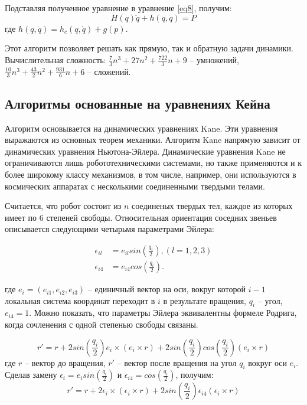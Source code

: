Подставляя полученное уравнение в уравнение \ref{eq8}, получим:
\begin{equation}
H(q) \ddot q + h (q, \dot q) = P
\end{equation}
где $h (q, \dot q) = h_c (q, \dot q) + g(p)$.

Этот алгоритм позволяет решать как прямую, так и обратную задачи динамики. Вычислительная сложность: $\frac{7}{3} n^3 + 27 n^2 + \frac{722}{3} n + 9$ -- умножений, $\frac{10}{3} n^3 + \frac{43}{2} n^2 + \frac{931}{6} n + 6$ -- сложений.


\subsection{Алгоритмы основанные на уравнениях Кейна}
Алгоритм основывается на динамических уравнениях Kane. Эти уравнения выражаются из основных теорем механики. Алгоритм Kane напрямую зависит от динамических уравнения Ньютона-Эйлера. Динамические уравнения Kane не ограничиваются лишь робототехническими системами, но также применяются и к более широкому классу механизмов, в том числе, например, они используются в космических аппаратах с несколькими соединенными твердыми телами.

Считается, что робот состоит из $n$ соединеных твердых тел, каждое из которых имеет по 6 степеней свободы. Относительная ориентация соседних звеньев описывается следующими четырьмя параметрами Эйлера:

\begin{align*}
\epsilon_{il} &= e_{il} sin (\frac{q_i}{2}), (l=1,2,3)\\
\epsilon_{i4} &= e_{i4} cos (\frac{q_i}{2}). 
\end{align*}

где $e_i = (e_{i1}, e_{i2}, e_{i3})$ -- единичный вектор на оси, вокруг которой $i-1$ локальная система координат переходит в $i$ в результате вращения, $q_i$ -- угол, $e_{i4} = 1$. Можно показать, что параметры Эйлера эквивалентны формеле Родрига, когда сочленения с одной степенью свободы связаны. 

\begin{equation}
r' = r + 2 sin (\frac{q_i}{2}) e_i \times (e_i \times r) + 2 sin (\frac{q_i}{2}) cos (\frac{q_i}{2}) (e_i \times r)
\end{equation}
где $r$ -- вектор до вращения, $r'$ -- вектор после вращения на угол $q_i$ вокруг оси $e_i$. Сделав замену $\epsilon_i =e_i sin (\frac{q_i}{2}) $ и $\epsilon_{i4} = cos  (\frac{q_i}{2})$, получим:
\begin{equation}
r' = r + 2 \epsilon_i \times (\epsilon_i \times r) + 2 sin (\frac{q_i}{2}) \epsilon_{i4} (\epsilon_i \times r)
\end{equation}

